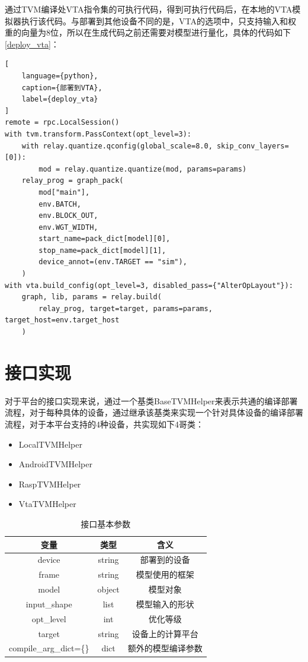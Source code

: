 通过TVM编译处VTA指令集的可执行代码，得到可执行代码后，在本地的VTA模拟器执行该代码。与部署到其他设备不同的是，VTA的选项中，只支持输入和权重的向量为8位，所以在生成代码之前还需要对模型进行量化，具体的代码如下\ref{deploy_vta}：

\begin{lstlisting}[
    language={python},
    caption={部署到VTA},
    label={deploy_vta}
]
remote = rpc.LocalSession()
with tvm.transform.PassContext(opt_level=3):
    with relay.quantize.qconfig(global_scale=8.0, skip_conv_layers=[0]):
        mod = relay.quantize.quantize(mod, params=params)
    relay_prog = graph_pack(
        mod["main"],
        env.BATCH,
        env.BLOCK_OUT,
        env.WGT_WIDTH,
        start_name=pack_dict[model][0],
        stop_name=pack_dict[model][1],
        device_annot=(env.TARGET == "sim"),
    )
with vta.build_config(opt_level=3, disabled_pass={"AlterOpLayout"}):
    graph, lib, params = relay.build(
        relay_prog, target=target, params=params, target_host=env.target_host
    )
\end{lstlisting}


\section{接口实现}

对于平台的接口实现来说，通过一个基类BaseTVMHelper来表示共通的编译部署流程，对于每种具体的设备，通过继承该基类来实现一个针对具体设备的编译部署流程，对于本平台支持的4种设备，共实现如下4哥类：
\begin{itemize}
    \item {LocalTVMHelper}
    \item {AndroidTVMHelper}
    \item {RaspTVMHelper}
    \item {VtaTVMHelper}
\end{itemize}

\begin{table}
    \centering
    \caption{接口基本参数}
    \label{interface_base_params}
    \begin{tabular}{c|c|c}
        \hline
        变量                      & 类型     & 含义        \\ \hline
        device                  & string & 部署到的设备    \\ \hline
        frame                   & string & 模型使用的框架   \\ \hline
        model                   & object & 模型对象      \\ \hline
        input\_shape            & list   & 模型输入的形状   \\ \hline
        opt\_level              & int    & 优化等级      \\ \hline
        target                  & string & 设备上的计算平台  \\ \hline
        compile\_arg\_dict=\{\} & dict   & 额外的模型编译参数 \\ \hline
    \end{tabular}
\end{table}

